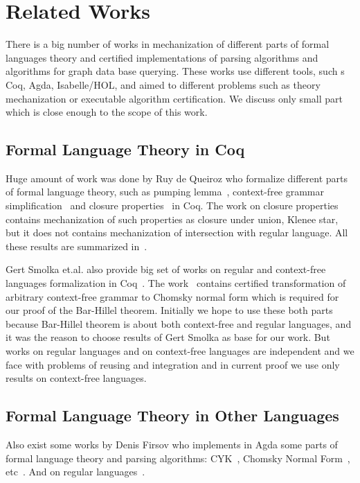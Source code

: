 \section{Related Works}

There is a big number of works in mechanization of different parts of formal languages theory and certified implementations of parsing algorithms and algorithms for graph data base querying.
These works use different tools, such s Coq, Agda, Isabelle/HOL, and aimed to different problems such as theory mechanization or executable algorithm certification.
We discuss only small part which is close enough to the scope of this work.

\subsection{Formal Language Theory in Coq}
Huge amount of work was done by Ruy de Queiroz who formalize different parts of formal language theory, such as pumping lemma~\cite{ramos2015formalizationPumping}, context-free grammar simplification~\cite{ramos2015formalization} and closure properties~\cite{ramos2015formalizationClosure} in Coq.
The work on closure properties contains mechanization of such properties as closure under union, Klenee star, but it does not contains mechanization of intersection with regular language.
All these results are summarized in~\cite{ramos2016formalization}. 

Gert Smolka et.al. also provide big set of works on regular and context-free languages formalization in Coq~\cite{smolka2017regular,smolka2013regular,kaiser2012constructive,smolkaHofmann2016}.
The work~\cite{smolkaHofmann2016} contains certified transformation of arbitrary context-free grammar to Chomsky normal form which is required for our proof of the Bar-Hillel theorem. 
Initially we hope to use these both parts because Bar-Hillel theorem is about both context-free and regular languages, and it was the reason to choose results of Gert Smolka as base for our work.
But works on regular languages and on context-free languages are independent and we face with  problems of reusing and integration and in current proof we use only results on context-free languages.

\subsection{Formal Language Theory in Other Languages}

Also exist some works by Denis Firsov who implements in Agda some parts of formal language theory and parsing algorithms: CYK~\cite{firsov2014certified}, Chomsky Normal Form~\cite{firsov2015certified}, etc~\cite{firsov2016cfl}.
And on regular languages~\cite{10.1007/978-3-319-03545-1_7}.

